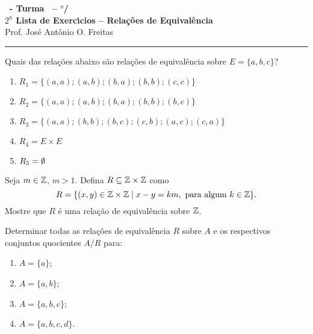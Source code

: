 \documentclass[12pt]{exam}
\begin{document}
\begin{center}
{\Large\bf \disciplina\ - Turma \turma\ -- \semestre$^{o}$/\ano} \\ \vspace{9pt} {\large\bf
  $2^{\underline{a}}$ Lista de Exerc{\'\i}cios -- Rela{\c c}{\~o}es de Equival{\^e}ncia}\\ \vspace{9pt} Prof. Jos{\'e} Ant{\^o}nio O. Freitas
\end{center}
\hrule

\vspace{.6cm}

\questao Quais das rela{\c c}{\~o}es abaixo s{\~a}o rela{\c c}{\~o}es de equival{\^e}ncia sobre $E = \{a,b,c\}$?
\begin{enumerate}[label={\alph*})]
    \item $R_1 = \{(a,a);(a,b);(b,a);(b,b);(c,c)\}$
    \item $R_2 = \{(a,a);(a,b);(b,a);(b,b);(b,c)\}$
    \item $R_3 = \{(a,a);(b,b);(b,c);(c,b);(a,c);(c,a)\}$
    \item $R_4 = E \times E$
    \item $R_5 = \emptyset$
\end{enumerate}

\vspace{.3cm}

\questao Seja $m \in \mathbb{Z}$, $m > 1$. Defina $R \subseteq \mathbb{Z}\times\mathbb{Z}$ como
\[
  R = \{(x,y) \in \mathbb{Z}\times\mathbb{Z} \mid x - y = km, \mbox{ para algum } k \in \mathbb{Z}\}.
\]
Mostre que $R$ \'e uma rela\c{c}\~ao de equival\^encia sobre $\mathbb{Z}$.

\vspace{.3cm}

\questao Determinar todas as rela{\c c}{\~o}es de equival{\^e}ncia
$R$ sobre $A$ e os respectivos conjuntos quocientes $A/R$ para:
\begin{enumerate}[label={\alph*})]
    \item $A=\{a\}$;
    \item $A=\{a,b\}$;
    \item $A=\{a,b,c\}$;
    \item $A=\{a,b,c,d\}$.
\end{enumerate}

\vspace{.3cm}
\end{document}
